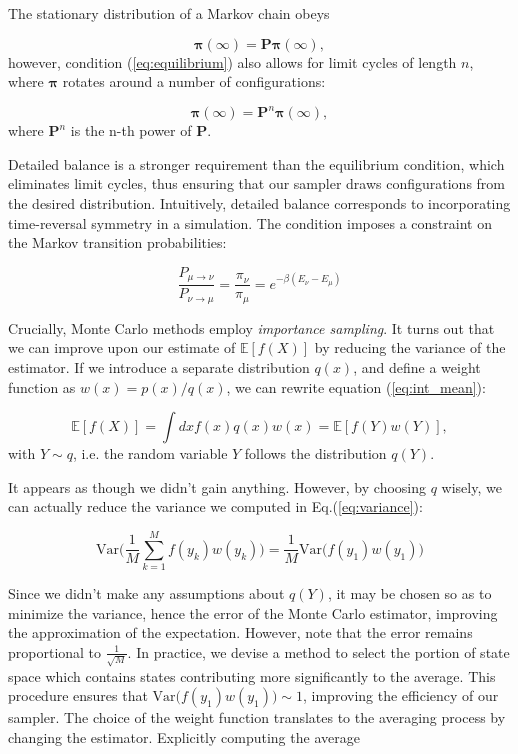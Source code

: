The stationary distribution of a Markov chain obeys

\begin{equation}
\bm \pi ( \infty ) = \bm P \bm \pi ( \infty ) ,
\end{equation}
however, condition (\ref{eq:equilibrium}) also allows  for limit cycles of length $n$, where $\bm \pi$ rotates around a number of configurations:

\begin{equation}
\bm \pi ( \infty ) = \bm P^n \bm \pi ( \infty ) ,
\end{equation}
where $\bm P^n$ is the n-th power of $\bm P$.

Detailed balance is a stronger requirement than the equilibrium condition, which eliminates limit cycles, thus ensuring that our sampler draws configurations from the desired distribution.
Intuitively, detailed balance corresponds to incorporating time-reversal symmetry in a simulation.
The condition imposes a constraint on the Markov transition probabilities:

\begin{equation}\label{eq:markovCondition}
\frac{P_{\mu\rightarrow\nu}}{P_{\nu\rightarrow\mu}} = \frac{\pi_\nu}{\pi_\mu} = e^{-\beta ( E_\nu - E_\mu ) }
\end{equation}

Crucially, Monte Carlo methods employ \emph{importance sampling}.
It turns out that we can improve upon our estimate of $\mathbb{E} [f(X)]$ by reducing the variance of the estimator. If we introduce a separate distribution $q(x)$, and define a weight function as $w(x) = p(x)/ q(x)$, we can rewrite equation (\ref{eq:int_mean}):

\begin{equation}
\mathbb{E} [f(X)] = \int dx f(x) q(x) w(x) = \mathbb{E} [f(Y) w(Y)],
\end{equation}
with $Y \sim q$, i.e. the random variable $Y$ follows the distribution $q(Y)$.

It appears as though we didn't gain anything. However, by choosing $q$ wisely, we can actually reduce the variance we computed in Eq.(\ref{eq:variance}):

\begin{equation}
\text{Var}\bigg( \frac{1}{M} \sum_{k=1}^M f(y_k) w(y_k) \bigg) = \frac{1}{M} \text{Var}\bigg( f(y_1) w(y_1) \bigg)
\end{equation}

Since we didn't make any assumptions about $q(Y)$, it may be chosen so as to minimize the variance, hence the error of the Monte Carlo estimator, improving the approximation of the expectation. However, note that the error remains proportional to $\frac{1}{\sqrt{M}}$.
In practice, we devise a method to select the portion of state space which contains states contributing more significantly to the average.
This procedure ensures that $\text{Var}\big( f(y_1) w(y_1) \big) \sim 1$, improving the efficiency of our sampler.
The choice of the weight function translates to the averaging process by changing the estimator.
Explicitly computing the average


